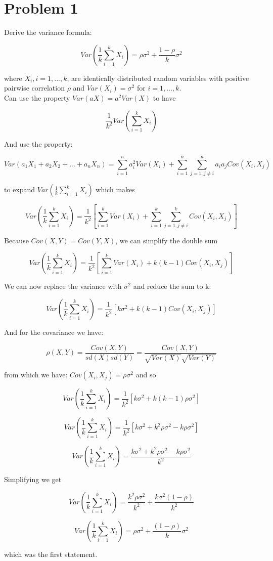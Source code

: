 \section*{Problem 1}

Derive the variance formula: 

\[ Var(\frac{1}{k} \sum\limits_{i=1}^k X_i ) = \rho\sigma^2 + \frac{1 - \rho}{k}\sigma^2 \]

where $X_i , i = 1,...,k$, are identically distributed random variables with positive pairwise correlation $\rho$ and $Var(X_i) = \sigma^2 $ for $ i = 1,...,k$. \\


\noindent Can use the property $Var(aX) = a^2Var(X)$ to have

\[ \frac{1}{k^2}Var(\sum\limits_{i=1}^k X_i) \]


\noindent And use the property: 

\[ Var(a_1X_1 + a_2X_2 + ... + a_nX_n) = \sum_{i=1}^{n} a_i^2Var(X_i) + \sum_{i=1}^{n}\sum_{j=1, j \neq i}^{n}a_i a_j Cov(X_i, X_j) \]

\noindent to expand $Var(\frac{1}{k} \sum_{i=1}^{k} X_i )$ which makes

\[ Var(\frac{1}{k} \sum\limits_{i=1}^k X_i ) = \frac{1}{k^2}[ \sum\limits_{i=1}^kVar(X_i) + \sum\limits_{i=1}^k \sum\limits_{j=1, j \neq i}^k Cov(X_i, X_j)]  \]


\noindent Because $Cov(X,Y) = Cov(Y,X)$, we can simplify the double sum 

\[ Var(\frac{1}{k} \sum\limits_{i=1}^k X_i ) = \frac{1}{k^2}[ \sum\limits_{i=1}^kVar(X_i) + k(k - 1) Cov(X_i, X_j)] \]

\noindent We can now replace the variance with $\sigma^2$ and reduce the sum to k:
 
\[ Var(\frac{1}{k} \sum\limits_{i=1}^k X_i ) = \frac{1}{k^2}[ k\sigma^2 + k(k - 1) Cov(X_i, X_j)] \] 


\noindent And for the covariance we have: 

\[ \rho(X,Y) = \frac{Cov(X,Y)}{sd(X) sd(Y)} = \frac{Cov(X,Y)}{\sqrt{Var(X)} \sqrt{Var(Y)}} \]

\noindent from which we have: $Cov(X_i, X_j) = \rho\sigma^2$ and so

\[ Var(\frac{1}{k} \sum\limits_{i=1}^k X_i ) = \frac{1}{k^2}[ k\sigma^2 + k(k - 1)\rho\sigma^2] \]

\[ Var(\frac{1}{k} \sum\limits_{i=1}^k X_i ) = \frac{1}{k^2}[ k\sigma^2 + k^2\rho\sigma^2 - k\rho\sigma^2] \]

\[ Var(\frac{1}{k} \sum\limits_{i=1}^k X_i ) = \frac{k\sigma^2 + k^2\rho\sigma^2 - k\rho\sigma^2}{k^2} \]


\noindent Simplifying we get

\[ Var(\frac{1}{k} \sum\limits_{i=1}^k X_i ) = \frac{k^2\rho\sigma^2}{k^2} + \frac{k\sigma^2(1-\rho)}{k^2} \]

\[ Var(\frac{1}{k} \sum\limits_{i=1}^k X_i ) = \rho\sigma^2 + \frac{(1-\rho)}{k}\sigma^2 \]

\noindent which was the first statement. 







